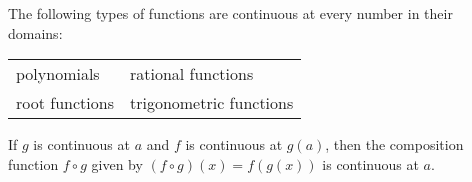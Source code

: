 \begin{frame}
\begin{theorem}
The following types of functions are continuous at every number in their domains:

\begin{tabular}{ll}
polynomials & rational functions \\
root functions & trigonometric functions
\end{tabular}
\end{theorem}
\begin{theorem}
If $g$ is continuous at $a$ and $f$ is continuous at $g(a)$, then the composition function $f\circ g$ given by $(f\circ g)(x) = f(g(x))$ is continuous at $a$.
\end{theorem}
\end{frame}
